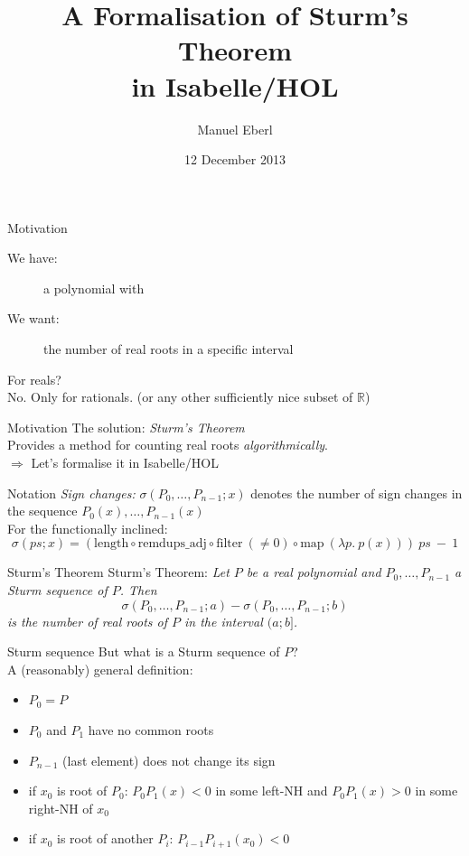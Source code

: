 \documentclass[%
	sans,			%
	mathsans,		%
	10pt,
	t		%
	slidescentered,%
]{beamer}
\title[asdf]{A Formalisation of Sturm's Theorem\\in Isabelle/HOL}
\subtitle{}
\author{Manuel Eberl}
\date{12 December 2013} %
\newcommand{\RR}{\mathbb{R}}
\begin{document}
\AddToShipoutPicture{\TitlePicture}
\maketitle
\ClearShipoutPicture
\AddToShipoutPicture{\BackgroundPicture}

\begin{frame}{Motivation}
\begin{description}
\item[We have:] a polynomial with {}
\pause\item[We want:] the number of real roots in a specific interval
\end{description}\vskip5mm
\pause
For reals?\\\pause
No. Only for rationals. (or any other sufficiently nice subset of $\RR$)
\end{frame}

\begin{frame}{Motivation}
The solution: \emph{Sturm's Theorem}\\[2mm]

Provides a method for counting real roots \emph{algorithmically}.\\[10mm]

$\Longrightarrow$ Let's formalise it in Isabelle/HOL
\end{frame}

\begin{frame}{Notation}
\emph{Sign changes:} $\sigma(P_0,\ldots,P_{n-1}; x)$ denotes the number of sign changes in the sequence $P_0(x), \ldots, P_{n-1}(x)$\\[2mm]
For the functionally inclined:\vskip-6mm
$$\sigma(ps; x) = (\mathrm{length} \circ \mathrm{remdups\_adj} \circ \mathrm{filter}\ (\neq 0) \circ \mathrm{map}\ (\lambda p.\ p(x)))\ ps\ -\ 1$$
\end{frame}

\begin{frame}{Sturm's Theorem}
Sturm's Theorem: \textit{Let $P$ be a real polynomial and $P_0, \ldots, P_{n-1}$ a Sturm sequence of $P$. Then
$$\sigma(P_0, \ldots, P_{n-1}; a) - \sigma(P_0, \ldots, P_{n-1}; b)$$
is the number of real roots of $P$ in the interval $(a; b]$.}
\end{frame}

\begin{frame}{Sturm sequence}
But what is a Sturm sequence of $P$?\\
A (reasonably) general definition:\\
\begin{itemize}
\item $P_0 = P$\pause
\item $P_0$ and $P_1$ have no common roots\pause
\item $P_{n-1}$ (last element) does not change its sign\pause
\item if $x_0$ is root of $P_0$: $P_0P_1(x)<0$ in some left-NH and $P_0P_1(x)>0$ in some right-NH of $x_0$\pause
\item if $x_0$ is root of another $P_i$: $P_{i-1}P_{i+1}(x_0) < 0$
\end{itemize}
\end{frame}
\end{document}
